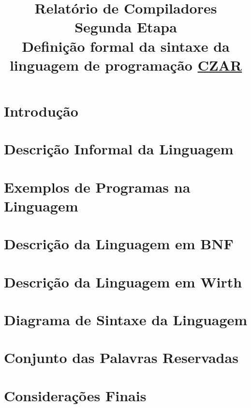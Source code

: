 \documentclass[12pt,oneside,a4paper,english]{abntex2}
\title{Relatório de Compiladores\\Segunda Etapa\\Definição formal da sintaxe da linguagem de programação \underline{CZAR}}
\begin{document}
\frenchspacing %

\imprimirfolhaderosto

\clearpage
\begin{resumo}
	
\end{resumo}

\tableofcontents

\textual

\chapter{Introdução}
\label{chap:introducao}
	

\chapter{Descrição Informal da Linguagem}
\label{chap:descricao-informal}
	

\chapter{Exemplos de Programas na Linguagem}
\label{chap:exemplo-programa}
	

\chapter{Descrição da Linguagem em BNF}
\label{chap:bnf}
	

\chapter{Descrição da Linguagem em Wirth}
\label{chap:wirth}
	

\chapter{Diagrama de Sintaxe da Linguagem}
\label{chap:diagrama}
	

\chapter{Conjunto das Palavras Reservadas}
\label{chap:palavras-reservadas}
	

\chapter{Considerações Finais}
\label{chap:conclusao}
	


\end{document}
